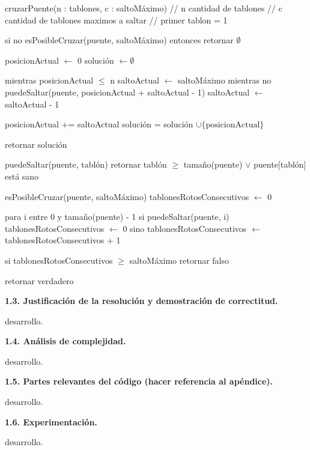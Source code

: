 cruzarPuente(n : tablones, c : saltoMáximo)
  // n cantidad de tablones
  // c cantidad de tablones maximos a saltar
  // primer tablon = 1

  si no esPosibleCruzar(puente, saltoMáximo) entonces retornar $\emptyset$

  posicionActual $\gets$ 0
  solución $\gets \emptyset$

  mientras posicionActual $\leq$ n
    saltoActual $\gets$ saltoMáximo
    mientras no puedeSaltar(puente, posicionActual + saltoActual - 1)
      saltoActual $\gets$ saltoActual - 1

    posicionActual += saltoActual
    solución = solución $\cup \{\text{posicionActual}\}$

  retornar solución

puedeSaltar(puente, tablón)
  retornar tablón $\geq$ tamaño(puente) $\lor$ puente[tablón] está sano

esPosibleCruzar(puente, saltoMáximo)
  tablonesRotosConsecutivos $\gets$ 0

  para i entre 0 y tamaño(puente) - 1
    si puedeSaltar(puente, i)
      tablonesRotosConsecutivos $\gets$ 0
    sino
      tablonesRotosConsecutivos $\gets$ tablonesRotosConsecutivos + 1

    si tablonesRotosConsecutivos $\geq$ saltoMáximo
      retornar falso

  retornar verdadero


\vspace*{0.75cm} \noindent



\noindent
\textbf{1.3. Justificación de la resolución y demostración de correctitud.}

\vspace*{0.3cm}

desarrollo.


\vspace*{0.75cm} \noindent



\noindent
\textbf{1.4. Análisis de complejidad.}

\vspace*{0.3cm}

desarrollo.


\vspace*{0.75cm} \noindent



\noindent
\textbf{1.5. Partes relevantes del código (hacer referencia al apéndice).}

\vspace*{0.3cm}

desarrollo.


\vspace*{0.75cm} \noindent



\noindent
\textbf{1.6. Experimentación.}

\vspace*{0.3cm}

desarrollo.
